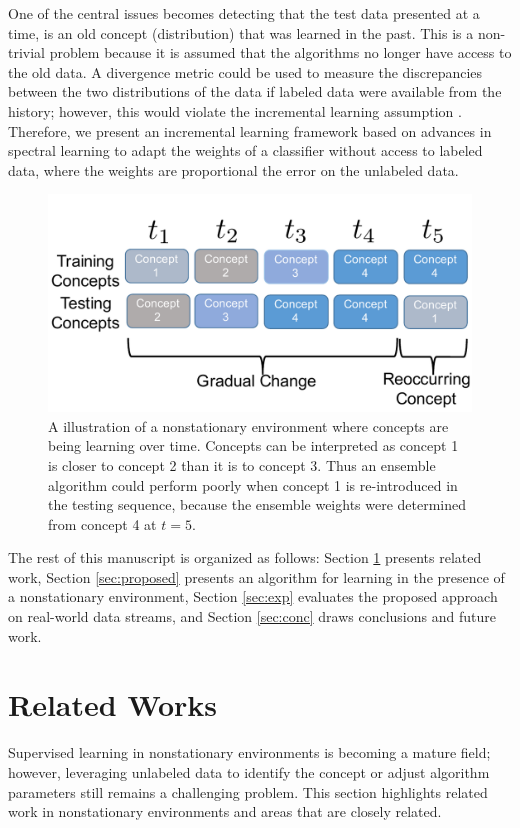 \documentclass[10pt, conference]{IEEEtran}
\begin{document}
One of the central issues becomes detecting that the test data presented at a time, is an old concept (distribution) that was learned in the past. This is a non-trivial problem because it is assumed that the algorithms no longer have access to the old data. A divergence metric could be used to measure the discrepancies between the two distributions of the data if labeled data were available from the history; however, this would violate the incremental learning assumption \cite{Polikar2001TSMC}. 
Therefore, we present an incremental learning framework based on advances in spectral learning to adapt the weights of a classifier without access to labeled data, where the weights are proportional the error on the unlabeled data. 


\begin{figure}
\centering
\includegraphics[width=.48\textwidth]{concepts.pdf}
\caption{A illustration of a nonstationary environment where concepts are being learning over time. Concepts can be interpreted as {concept 1} is closer to {concept 2} than it is to {concept 3}. Thus an ensemble algorithm could perform poorly when {concept 1} is re-introduced in the testing sequence, because the ensemble weights were determined from {concept 4} at $t=5$. }
\label{fig:concepts}
\end{figure}


The rest of this manuscript is organized as follows:  Section \ref{sec:rwork} presents related work,  Section \ref{sec:proposed} presents an  algorithm for learning in the presence of a nonstationary environment,  Section \ref{sec:exp} evaluates the proposed approach on real-world data streams, and Section \ref{sec:conc} draws conclusions and future work.

\section{Related Works}
\label{sec:rwork}

Supervised learning in  nonstationary environments is becoming a mature field; however, leveraging unlabeled data to identify the concept or adjust algorithm parameters still remains a challenging problem. This section highlights related work in nonstationary environments and areas that are closely related. 
\end{document}
